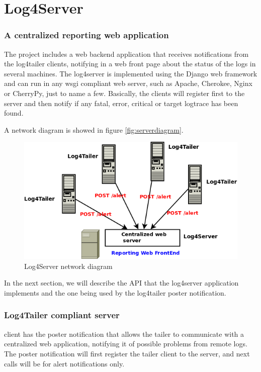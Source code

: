 \part{Log4Server}

\section{A centralized reporting web application}
\label{sec:log4server}
The \logftailer{} project includes a web backend application that receives
notifications from the log4tailer clients, notifying in a web front page about
the status of the logs in several machines. The log4server is implemented using
the Django web framework and can run in any wsgi compliant web server, such as
Apache, Cherokee, Nginx or CherryPy, just to name a few. Basically, the clients
will register first to the server and then notify if any fatal, error, critical
or target logtrace has been found. 

A network diagram is showed in figure \autoref{fig:serverdiagram}.

\begin{figure}[hb]
\centering
\includegraphics[scale=0.50]{serverdiagram.png}
\caption{Log4Server network diagram}\label{fig:serverdiagram}
\end{figure}


In the next section, we will describe the API that the log4server application implements and the 
one being used by the log4tailer poster notification.

\section{Log4Tailer compliant server}
\logftailer{} client has the poster notification that allows the tailer to communicate 
with a centralized web application, notifying it of possible problems from remote logs. 
The poster notification will first register the tailer client to the server, and next 
calls will be for alert notifications only.

